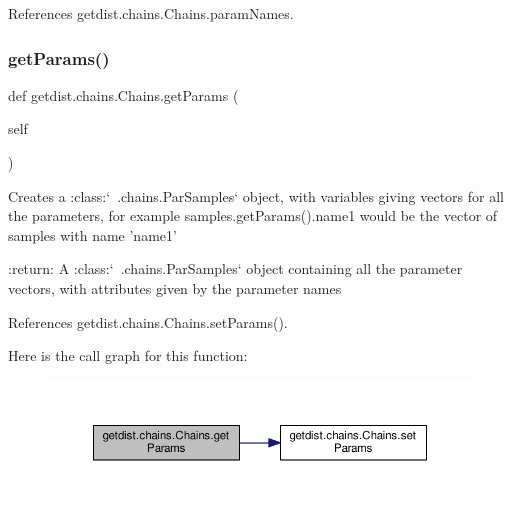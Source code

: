 References getdist.\+chains.\+Chains.\+param\+Names.

\mbox{\label{classgetdist_1_1chains_1_1Chains_a3738678aec04eba1970291046eada10b}} 
\subsubsection{\texorpdfstring{get\+Params()}{getParams()}}
{\footnotesize\ttfamily def getdist.\+chains.\+Chains.\+get\+Params (\begin{DoxyParamCaption}\item[{}]{self }\end{DoxyParamCaption})}

\begin{DoxyVerb}Creates a :class:`~.chains.ParSamples` object, with variables giving vectors for all the parameters,
for example samples.getParams().name1 would be the vector of samples with name 'name1'

:return: A :class:`~.chains.ParSamples` object containing all the parameter vectors, with attributes given by the parameter names
\end{DoxyVerb}
 

References getdist.\+chains.\+Chains.\+set\+Params().

Here is the call graph for this function\+:
\nopagebreak
\begin{figure}[H]
\begin{center}
\leavevmode
\includegraphics[width=350pt]{classgetdist_1_1chains_1_1Chains_a3738678aec04eba1970291046eada10b_cgraph}
\end{center}
\end{figure}
\mbox{\label{classgetdist_1_1chains_1_1Chains_a16d3828d299dda03e7ab074ae755e3fc}} 
